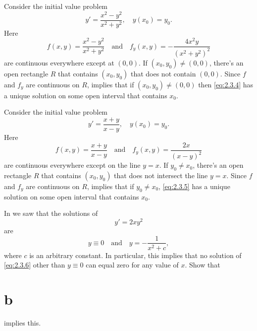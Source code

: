 \begin{example}\label{example:2.3.2}
Consider  the initial value problem
\begin{equation} \label{eq:2.3.4}
y'=\frac{x^2-y^2 }{x^2+y^2}, \quad y(x_0)=y_0.
\end{equation}
Here
\[
f(x,y)  =  \frac{x^2-y^2 }{x^2+y^2}\quad\text{and}\quad 
f_y(x,y)  =   -\frac{4x^2y }{(x^2+y^2)^2}
\]
are continuous everywhere except at $(0,0)$. If $(x_0,y_0)
\ne(0,0)$, there's an open rectangle $R$ that contains
$(x_0,y_0)$ that does not contain $(0,0)$. Since $f$ and $f_y$ are
continuous on $R$,  implies that if
$(x_0,y_0)\ne(0,0)$ then
\eqref{eq:2.3.4}
has a unique solution on some open interval that contains $x_0$.
\end{example}

\begin{example}\label{example:2.3.3}
Consider the initial value problem
\begin{equation} \label{eq:2.3.5}
y'=\frac{x+y}{x-y},\quad y(x_0)=y_0.
\end{equation}
Here
\[
f(x,y)  =  \frac{x+y}{x-y}\quad\text{and}\quad
f_y(x,y)  =  \frac{2x}{(x-y)^2}
\]
are continuous everywhere except on the line $y=x$. If $y_0\ne x_0$,
there's an open rectangle $R$ that contains $(x_0,y_0)$ that
does not intersect the line $y=x$. Since $f$ and $f_y$ are continuous
on $R$,  implies that if $y_0\ne x_0$,
\eqref{eq:2.3.5} has a unique solution on some open interval that contains
$x_0$.
\end{example}

\begin{example}\label{example:2.3.4}
In  we saw that the
solutions of
\begin{equation} \label{eq:2.3.6}
y'=2xy^2
\end{equation}
are
 \[
y\equiv0\quad\text{and}\quad  y=-\frac{1 }{x^2+c},
\]
where $c$ is an arbitrary constant. In particular, this implies that
no solution of \eqref{eq:2.3.6} other than $y\equiv0$ can equal zero for
any value of $x$. Show that \part{b} implies
this.
\end{example}

